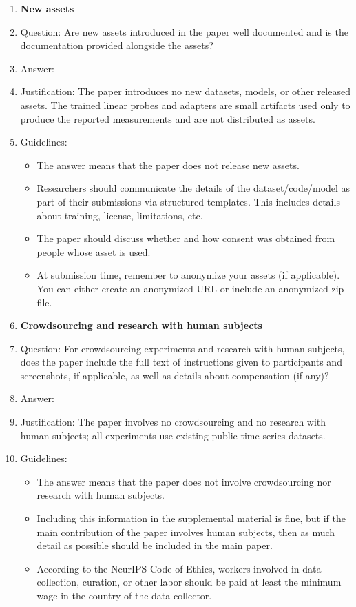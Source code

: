 \begin{enumerate}
\item {\bf New assets}
    \item[] Question: Are new assets introduced in the paper well documented and is the documentation provided alongside the assets?
    \item[] Answer: \answerNA{}
    \item[] Justification: The paper introduces no new datasets, models, or other released assets. The trained linear probes and adapters are small artifacts used only to produce the reported measurements and are not distributed as assets.
    \item[] Guidelines:
    \begin{itemize}
        \item The answer \answerNA{} means that the paper does not release new assets.
        \item Researchers should communicate the details of the dataset\slash code\slash model as part of their submissions via structured templates. This includes details about training, license, limitations, etc. 
        \item The paper should discuss whether and how consent was obtained from people whose asset is used.
        \item At submission time, remember to anonymize your assets (if applicable). You can either create an anonymized URL or include an anonymized zip file.
    \end{itemize}

\item {\bf Crowdsourcing and research with human subjects}
    \item[] Question: For crowdsourcing experiments and research with human subjects, does the paper include the full text of instructions given to participants and screenshots, if applicable, as well as details about compensation (if any)? 
    \item[] Answer: \answerNA{}
    \item[] Justification: The paper involves no crowdsourcing and no research with human subjects; all experiments use existing public time-series datasets.
    \item[] Guidelines:
    \begin{itemize}
        \item The answer \answerNA{} means that the paper does not involve crowdsourcing nor research with human subjects.
        \item Including this information in the supplemental material is fine, but if the main contribution of the paper involves human subjects, then as much detail as possible should be included in the main paper. 
        \item According to the NeurIPS Code of Ethics, workers involved in data collection, curation, or other labor should be paid at least the minimum wage in the country of the data collector. 
    \end{itemize}


\end{enumerate}
